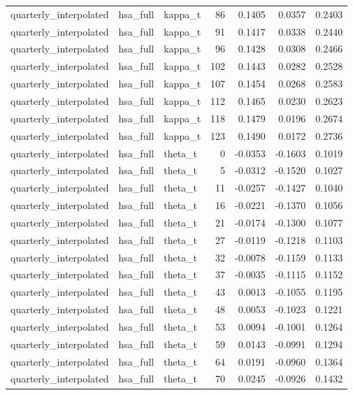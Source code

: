 \begin{tabular}{lllrrrr}
quarterly\_interpolated & hsa\_full & kappa\_t & 86 & 0.1405 & 0.0357 & 0.2403 \\
quarterly\_interpolated & hsa\_full & kappa\_t & 91 & 0.1417 & 0.0338 & 0.2440 \\
quarterly\_interpolated & hsa\_full & kappa\_t & 96 & 0.1428 & 0.0308 & 0.2466 \\
quarterly\_interpolated & hsa\_full & kappa\_t & 102 & 0.1443 & 0.0282 & 0.2528 \\
quarterly\_interpolated & hsa\_full & kappa\_t & 107 & 0.1454 & 0.0268 & 0.2583 \\
quarterly\_interpolated & hsa\_full & kappa\_t & 112 & 0.1465 & 0.0230 & 0.2623 \\
quarterly\_interpolated & hsa\_full & kappa\_t & 118 & 0.1479 & 0.0196 & 0.2674 \\
quarterly\_interpolated & hsa\_full & kappa\_t & 123 & 0.1490 & 0.0172 & 0.2736 \\
quarterly\_interpolated & hsa\_full & theta\_t & 0 & -0.0353 & -0.1603 & 0.1019 \\
quarterly\_interpolated & hsa\_full & theta\_t & 5 & -0.0312 & -0.1520 & 0.1027 \\
quarterly\_interpolated & hsa\_full & theta\_t & 11 & -0.0257 & -0.1427 & 0.1040 \\
quarterly\_interpolated & hsa\_full & theta\_t & 16 & -0.0221 & -0.1370 & 0.1056 \\
quarterly\_interpolated & hsa\_full & theta\_t & 21 & -0.0174 & -0.1300 & 0.1077 \\
quarterly\_interpolated & hsa\_full & theta\_t & 27 & -0.0119 & -0.1218 & 0.1103 \\
quarterly\_interpolated & hsa\_full & theta\_t & 32 & -0.0078 & -0.1159 & 0.1133 \\
quarterly\_interpolated & hsa\_full & theta\_t & 37 & -0.0035 & -0.1115 & 0.1152 \\
quarterly\_interpolated & hsa\_full & theta\_t & 43 & 0.0013 & -0.1055 & 0.1195 \\
quarterly\_interpolated & hsa\_full & theta\_t & 48 & 0.0053 & -0.1023 & 0.1221 \\
quarterly\_interpolated & hsa\_full & theta\_t & 53 & 0.0094 & -0.1001 & 0.1264 \\
quarterly\_interpolated & hsa\_full & theta\_t & 59 & 0.0143 & -0.0991 & 0.1294 \\
quarterly\_interpolated & hsa\_full & theta\_t & 64 & 0.0191 & -0.0960 & 0.1364 \\
quarterly\_interpolated & hsa\_full & theta\_t & 70 & 0.0245 & -0.0926 & 0.1432 \\

\end{tabular}
